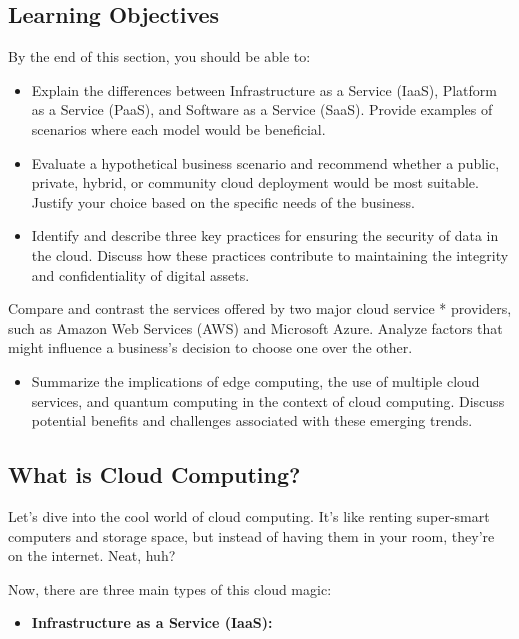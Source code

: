 \documentclass[
  letterpaper,
  DIV=11,
  numbers=noendperiod]{scrreprt}
\providecommand{\tightlist}{%
  \setlength{\itemsep}{0pt}\setlength{\parskip}{0pt}}\usepackage{longtable,booktabs,array}
\begin{document}
\subsection{Learning Objectives}\label{learning-objectives-4}

By the end of this section, you should be able to:

\begin{itemize}
\item
  Explain the differences between Infrastructure as a Service (IaaS),
  Platform as a Service (PaaS), and Software as a Service (SaaS).
  Provide examples of scenarios where each model would be beneficial.
\item
  Evaluate a hypothetical business scenario and recommend whether a
  public, private, hybrid, or community cloud deployment would be most
  suitable. Justify your choice based on the specific needs of the
  business.
\item
  Identify and describe three key practices for ensuring the security of
  data in the cloud. Discuss how these practices contribute to
  maintaining the integrity and confidentiality of digital assets.
\end{itemize}

Compare and contrast the services offered by two major cloud service *
providers, such as Amazon Web Services (AWS) and Microsoft Azure.
Analyze factors that might influence a business's decision to choose one
over the other.

\begin{itemize}
\tightlist
\item
  Summarize the implications of edge computing, the use of multiple
  cloud services, and quantum computing in the context of cloud
  computing. Discuss potential benefits and challenges associated with
  these emerging trends.
\end{itemize}

\subsection{What is Cloud Computing?}\label{what-is-cloud-computing}

Let's dive into the cool world of cloud computing. It's like renting
super-smart computers and storage space, but instead of having them in
your room, they're on the internet. Neat, huh?

Now, there are three main types of this cloud magic:

\begin{itemize}
\tightlist
\item
  \textbf{Infrastructure as a Service (IaaS):}
\end{itemize}
\end{document}
